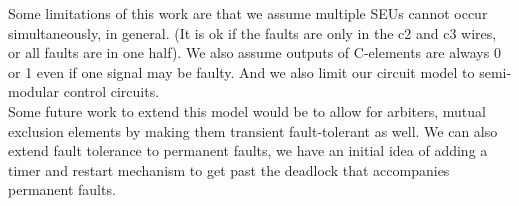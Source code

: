 \documentclass[12pt]{report}
\begin{document}
Some limitations of this work are that we assume multiple SEUs cannot occur simultaneously, in general. (It is ok if the faults are only in the c2 and c3 wires, or all faults are in one half).  We also assume outputs of C-elements are always 0 or 1 even if one signal may be faulty.  And we also limit our circuit model to semi-modular control circuits.\\

Some future work to extend this model would be to allow for arbiters, mutual exclusion elements by making them transient fault-tolerant as well.  We can also extend fault tolerance to permanent faults, we have an initial idea of adding a timer and restart mechanism to get past the deadlock that accompanies permanent faults.




%


\end{document}
